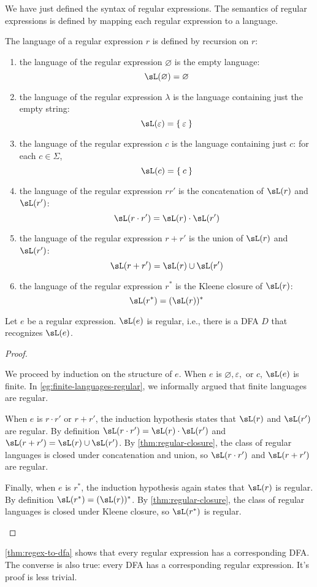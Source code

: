 \documentclass{zett}
\begin{document}
\begin{node}
  We have just defined the syntax of regular expressions.
  The semantics of regular expressions is defined by mapping each regular expression to a language.
\end{node}

\begin{defn}
  The language of a regular expression $r$ is defined by recursion on $r$:
  \begin{enumerate}
  \item the language of the regular expression $\varnothing$ is the empty language:
    $$\sL(\varnothing) = \varnothing$$
  \item the language of the regular expression $\lambda$ is the language containing just the empty string:
    $$\sL(\varepsilon) = \Set{\varepsilon}$$
  \item the language of the regular expression $c$ is the language containing just $c$: for each $c \in \Sigma$,
    $$\sL(c) = \Set{c}$$
  \item the language of the regular expression $rr'$ is the concatenation of $\sL(r)$ and $\sL(r')$:
    $$\sL(r \cdot r') = \sL(r) \cdot \sL(r')$$
  \item the language of the regular expression $r + r'$ is the union of $\sL(r)$ and $\sL(r')$:
    $$\sL(r + r') = \sL(r) \cup \sL(r')$$
  \item the language of the regular expression $r^{*}$ is the Kleene closure of $\sL(r)$:
    $$\sL(r^{*}) = (\sL(r))^{*}$$
  \end{enumerate}
\end{defn}

\begin{thm}\label{thm:regex-to-dfa}
  Let $e$ be a regular expression.
  $\sL(e)$ is regular, i.e., there is a DFA $D$ that recognizes $\sL(e)$.
\end{thm}
\begin{proof}
  \begin{node}
    We proceed by induction on the structure of $e$.
    When $e$ is $\varnothing, \varepsilon,$ or $c$, $\sL(e)$ is finite.
    In \cref{eg:finite-languages-regular}, we informally argued that finite languages are regular.
  \end{node}
  \begin{node}
    When $e$ is $r \cdot r'$ or $r + r'$, the induction hypothesis states that $\sL(r)$ and $\sL(r')$ are regular.
    By definition $\sL(r \cdot r') = \sL(r) \cdot \sL(r')$ and $\sL(r + r') = \sL(r) \cup \sL(r')$.
    By \cref{thm:regular-closure}, the class of regular languages is closed under concatenation and union, so $\sL(r \cdot r')$ and $\sL(r + r')$ are regular.
  \end{node}
  \begin{node}
    Finally, when $e$ is $r^{*}$, the induction hypothesis again states that $\sL(r)$ is regular.
    By definition $\sL(r^{*}) = (\sL(r))^{*}$.
    By \cref{thm:regular-closure}, the class of regular languages is closed under Kleene closure, so $\sL(r^{*})$ is regular.
  \end{node}
\end{proof}

\begin{node}
  \cref{thm:regex-to-dfa} shows that every regular expression has a corresponding DFA.
  The converse is also true: every DFA has a corresponding regular expression.
  It's proof is less trivial.
\end{node}
\end{document}
